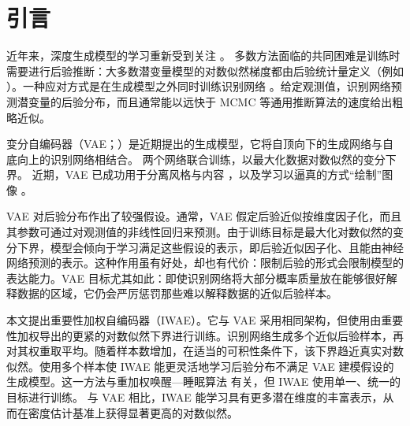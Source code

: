 \section{引言}

近年来，深度生成模型的学习重新受到关注 \citep{greedy-dbn,dbm,DARN,vae,vae2}。
多数方法面临的共同困难是训练时需要进行后验推断：大多数潜变量模型的对数似然梯度都由后验统计量定义（例如 \citet{dbm,deep-sigmoid,DARN}）。一种应对方式是在生成模型之外同时训练识别网络 \citep{helmholtz_machine}。给定观测值，识别网络预测潜变量的后验分布，而且通常能以远快于 MCMC 等通用推断算法的速度给出粗略近似。

变分自编码器（VAE；\citet{vae,vae2}）是近期提出的生成模型，它将自顶向下的生成网络与自底向上的识别网络相结合。
两个网络联合训练，以最大化数据对数似然的变分下界。
近期，VAE 已成功用于分离风格与内容 \citep{vae-semi-supervised,tejas_vae}，以及学习以逼真的方式“绘制”图像 \citep{draw}。

VAE 对后验分布作出了较强假设。通常，VAE 假定后验近似按维度因子化，而且其参数可通过对观测值的非线性回归来预测。由于训练目标是最大化对数似然的变分下界，模型会倾向于学习满足这些假设的表示，即后验近似因子化、且能由神经网络预测的表示。这种作用虽有好处，却也有代价：限制后验的形式会限制模型的表达能力。VAE 目标尤其如此：即使识别网络将大部分概率质量放在能够很好解释数据的区域，它仍会严厉惩罚那些难以解释数据的近似后验样本。

本文提出重要性加权自编码器（IWAE）。它与 VAE 采用相同架构，但使用由重要性加权导出的更紧的对数似然下界进行训练。识别网络生成多个近似后验样本，再对其权重取平均。随着样本数增加，在适当的可积性条件下，该下界趋近真实对数似然。使用多个样本使 IWAE 能更灵活地学习后验分布不满足 VAE 建模假设的生成模型。这一方法与重加权唤醒—睡眠算法 \citep{RWS} 有关，但 IWAE 使用单一、统一的目标进行训练。
与 VAE 相比，IWAE 能学习具有更多潜在维度的丰富表示，从而在密度估计基准上获得显著更高的对数似然。
